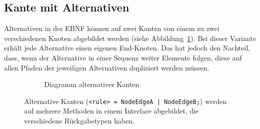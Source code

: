 \documentclass[../InterneDSLs.tex]{subfiles}
\begin{document}
\subsection{Kante mit Alternativen}\label{SEC:Alternative}
Alternativen in der EBNF können auf zwei Kanten von einem zu zwei verschiedenen Knoten abgebildet werden (siehe Abbildung~\ref{FIG:DiagramAlternativeNodeVariant}). Bei dieser Variante erhält jede Alternative einen eigenen End-Knoten. Das hat jedoch den Nachteil, dass, wenn der Alternative in einer Sequenz weiter Elemente folgen, diese auf allen Pfaden der jeweiligen Alternativen dupliziert werden müssen.
\begin{figure}[ht]
\centering
  \begin{subfigure}[c]{0.49\textwidth}
    \caption{Diagramm alternativer Kanten}
    \label{FIG:DiagramAlternativeNodeVariant}
  \end{subfigure}
  \begin{subfigure}[c]{0.49\textwidth}
    
  \end{subfigure}
  \caption[Abbildung alternativer Kanten Variante 1]{Alternative Kanten (\texttt{<rule> = NodeEdgeA | NodeEdgeB;}) werden auf mehrere Methoden in einem Interface abgebildet, die verschiedene Rückgabetypen haben.}
  \label{FIG:AlternativeNodeVariant}
\end{figure}
\end{document}
